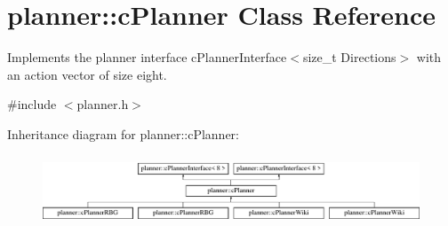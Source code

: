 \hypertarget{classplanner_1_1c_planner}{}\section{planner\+:\+:c\+Planner Class Reference}
\label{classplanner_1_1c_planner}


Implements the planner interface c\+Planner\+Interface$<$size\+\_\+t Directions$>$ with an action vector of size eight.  




{\ttfamily \#include $<$planner.\+h$>$}

Inheritance diagram for planner\+:\+:c\+Planner\+:\begin{figure}[H]
\begin{center}
\leavevmode
\includegraphics[height=2.089552cm]{classplanner_1_1c_planner}
\end{center}
\end{figure}
